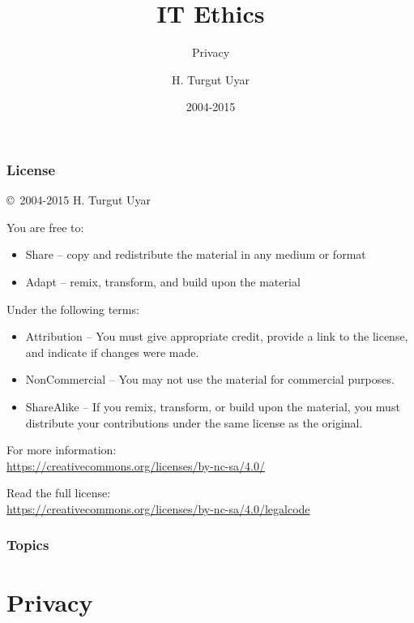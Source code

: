 \documentclass[dvipsnames]{beamer}
\title{IT Ethics}
\subtitle{Privacy}
\author{H. Turgut Uyar}
\date{2004-2015}
\theoremstyle{definition}
\theoremstyle{example}
\theoremstyle{plain}
\begin{document}
\begin{frame}
  \titlepage
\end{frame}

\begin{frame}
  \frametitle{License}

  \hfill
  \copyright~2004-2015 H. Turgut Uyar

  \vfill
  \begin{footnotesize}
    You are free to:
    \begin{itemize}
      \itemsep0em
      \item Share -- copy and redistribute the material in any medium or format
      \item Adapt -- remix, transform, and build upon the material
    \end{itemize}

    Under the following terms:
    \begin{itemize}
      \itemsep0em
      \item Attribution -- You must give appropriate credit, provide a link to
        the license, and indicate if changes were made.

      \item NonCommercial -- You may not use the material for commercial
        purposes.

      \item ShareAlike -- If you remix, transform, or build upon the material,
        you must distribute your contributions under the same license as the
        original.
    \end{itemize}
  \end{footnotesize}

  \begin{small}
    For more information:\\
    \url{https://creativecommons.org/licenses/by-nc-sa/4.0/}

    \smallskip
    Read the full license:\\
    \url{https://creativecommons.org/licenses/by-nc-sa/4.0/legalcode}
  \end{small}
\end{frame}

\begin{frame}
  \frametitle{Topics}
  \tableofcontents
\end{frame}

\section{Privacy}
\end{document}

